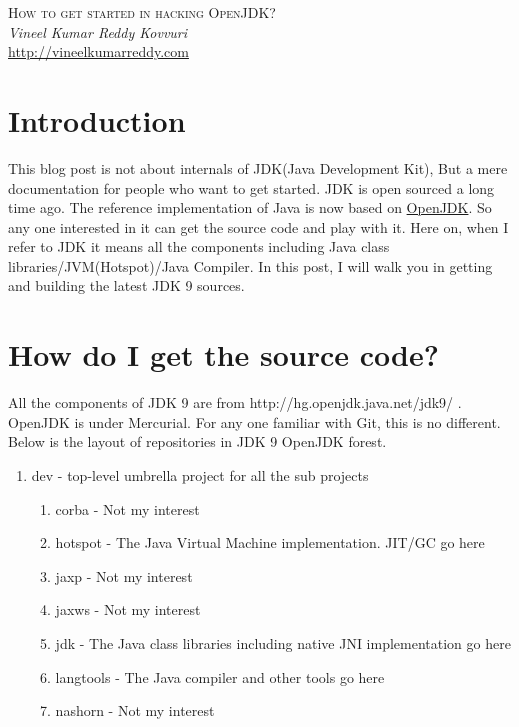 \documentclass{article}
\begin{document}
\begin{titlepage}
   \begin{center}
      \Large\textsc{How to get started in hacking OpenJDK?}\\
      \vspace{5mm}
      \Large\textit{Vineel Kumar Reddy Kovvuri}\\
      \url{http://vineelkumarreddy.com}\\
   \end{center}
\end{titlepage}

\tableofcontents

\newpage
\section{Introduction}
This blog post is not about internals of JDK(Java Development Kit), But a mere documentation for people who want to get started. JDK is open sourced a long time ago. The reference implementation of Java is now based on \href{http://openjdk.java.net/}{OpenJDK}. So any one interested in it can get the source code and play with it. Here on, when I refer to JDK it means all the components including Java class libraries/JVM(Hotspot)/Java Compiler. In this post, I will walk you in getting and building the latest JDK 9 sources.

\section{How do I get the source code?}
All the components of JDK 9 are from http://hg.openjdk.java.net/jdk9/ . OpenJDK is under Mercurial. For any one familiar with Git, this is no different. Below is the layout of repositories in JDK 9 OpenJDK forest.


\begin{enumerate}[noitemsep]
\item dev - top-level umbrella project for all the sub projects
    \begin{enumerate}[noitemsep]
    \item corba - Not my interest
    \item hotspot - The Java Virtual Machine implementation. JIT/GC go here
    \item jaxp - Not my interest
    \item jaxws - Not my interest
    \item jdk - The Java class libraries including native JNI implementation go here
    \item langtools - The Java compiler and other tools go here
    \item nashorn - Not my interest
    \end{enumerate}
\end{enumerate}
\end{document}
